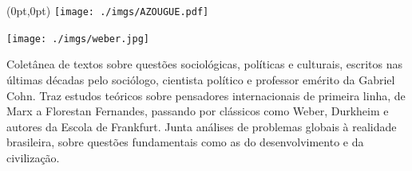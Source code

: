 \pagestyle{azougue}
\label{azougue}


\begin{textblock*}{5.625in}(0pt,0pt)%
\vspace*{-1.45cm}
\hspace*{-1.8cm}\texttt{[image: ./imgs/AZOUGUE.pdf]}
\end{textblock*}

\pagebreak

\hspace{.5cm}

\begin{center}
\hspace*{-2.5cm}
\hspace*{2cm}\texttt{[image: ./imgs/weber.jpg]}
\end{center}

\hspace*{-7cm}\hrulefill\hspace*{-7cm}

\medskip

\noindent{}Coletânea de textos sobre questões sociológicas, políticas e culturais, escritos nas últimas décadas pelo sociólogo, cientista político e professor emérito da  Gabriel Cohn. Traz estudos teóricos sobre pensadores internacionais de primeira linha, de Marx a Florestan Fernandes, passando por clássicos como Weber, Durkheim e autores da Escola de Frankfurt. Junta análises de problemas globais à realidade brasileira, sobre questões fundamentais como as do desenvolvimento e da civilização.

\vfill

\hspace*{-.4cm}\begin{minipage}[c]{1\linewidth}
\small{
{}}
\end{minipage}

\pagebreak

\hspace{.5cm}

